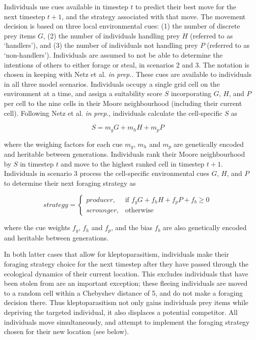\documentclass[11pt]{article}
\begin{document}
Individuals use cues available in timestep $t$ to predict their best move for the next timestep $t+1$, and the strategy associated with that move.
The movement decision is based on three local environmental cues: (1) the number of discrete prey items $G$, (2) the number of individuals handling  prey $H$ (referred to as `handlers'), and (3) the number of individuals not handling prey $P$ (referred to as `non-handlers').
Individuals are assumed to not be able to determine the intentions of others to either forage or steal, in scenarios 2 and 3.
The notation is chosen in keeping with Netz et al. \textit{in prep.}.
These cues are available to individuals in all three model scenarios.
Individuals occupy a single grid cell on the environment at a time, and assign a suitability score $S$ incorporating $G$, $H$, and $P$ per cell to the nine cells in their Moore neighbourhood (including their current cell).
Following Netz et al. \textit{in prep.}, individuals calculate the cell-specific $S$ as
\begin{linenomath*}
    \begin{equation}
        S = m_gG + m_hH + m_pP
    \end{equation}
\end{linenomath*}
where the weighing factors for each cue $m_g$, $m_h$ and $m_p$ are genetically encoded and heritable between generations.
Individuals rank their Moore neighbourhood by $S$ in timestep $t$ and move to the highest ranked cell in timestep $t+1$.
Individuals in scenario 3 process the cell-specific environmental cues $G$, $H$, and $P$ to determine their next foraging strategy as
\begin{linenomath*}
    \begin{equation}
        strategy = 
    \begin{cases}
        {producer},& \text{if } f_gG + f_hH + f_pP + f_b \geq 0\\
        {scrounger},              & \text{otherwise}
    \end{cases}
    \end{equation}
\end{linenomath*}
where the cue weights $f_g$, $f_h$ and $f_p$, and the bias $f_b$ are also genetically encoded and heritable between generations.

In both latter cases that allow for kleptoparasitism, individuals make their foraging strategy choice for the next timestep after they have passed through the ecological dynamics of their current location.
This excludes individuals that have been stolen from are an important exception; these fleeing individuals are moved to a random cell within a Chebyshev distance of 5, and do not make a foraging decision there.
Thus kleptoparasitism not only gains individuals prey items while depriving the targeted individual, it also displaces a potential competitor.
All individuals move simultaneously, and attempt to implement the foraging strategy chosen for their new location (see below).
\end{document}
